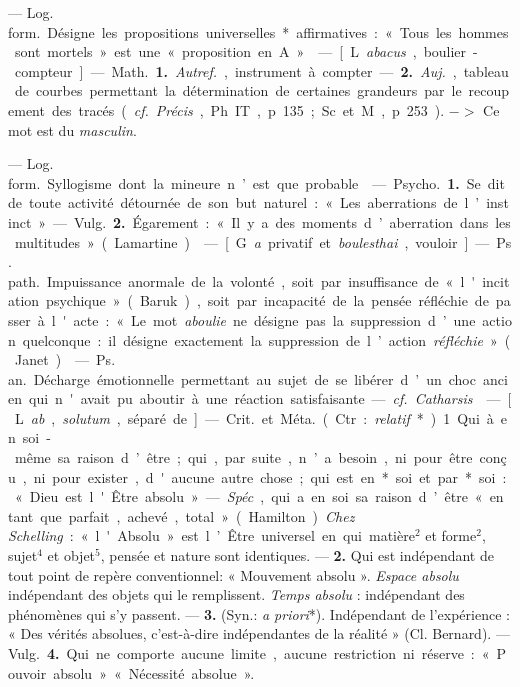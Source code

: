 
	\begin{itemize}[leftmargin=1cm, label=, itemsep=1pt]

 — \si{Log. form.} Désigne les propositions universelles*
affirmatives :
« Tous les hommes sont mortels »
est une « proposition en A ».

 — [L. {\it abacus}, boulier-compteur]
— \si{Math.} {\bf 1.} {\it Autref.}, instrument
à compter. — {\bf 2.} {\it Auj.}, tableau
de courbes permettant la détermination
de certaines grandeurs par
le recoupement des tracés ({\it cf.} {\it Précis},
Ph. IT, p. 135; Sc. et M., p. 253).
$->$ Ce mot est du {\it masculin}.

 — \si{Log. form.} Syllogisme
dont la mineure n’est que probable.

 — \si{Psycho.} {\bf 1.} Se dit de
toute activité détournée de son but
naturel : « Les aberrations de l’instinct ».
— \si{Vulg.} {\bf 2.} Égarement : « Il
y a des moments d’aberration dans
les multitudes » (Lamartine).

 — [G. {\it a}  privatif et {\it boulesthai},
vouloir] — \si{Ps. path.} Impuissance
anormale de la volonté, soit par
insuffisance de « l'incitation psychique »
(Baruk), soit par incapacité
de la pensée réfléchie de passer à
l'acte : « Le mot {\it aboulie} ne désigne
pas la suppression d’une action quelconque :
il désigne exactement la
suppression de l’action {\it réfléchie} »
(Janet).

 — \si{Ps. an.} Décharge émotionnelle
permettant au sujet de se
libérer d’un choc ancien qui n'avait
pu aboutir à une réaction satisfaisante.
— {\it cf.}  {\it Catharsis}.

 — [L. {\it ab}, {\it solutum}, séparé de]
— \si{Crit.} et \si{Méta.} (Ctr. : {\it relatif}*).
1. Qui à en soi-même sa raison
d’être; qui, par suite, n’a besoin, ni
pour être conçu, ni pour exister,
d'aucune autre chose; qui est en*
soi et par* soi : « Dieu est l'Être
absolu ». — {\it Spéc}., qui a en soi sa
raison d’être « en tant que parfait,
achevé, total » (Hamilton). {\it Chez
Schelling} : « l'Absolu » est l’Être
universel en qui matière$^2$ et forme$^2$,
sujet$^4$ et objet$^5$, pensée et nature
sont identiques. — {\bf 2.} Qui est indépendant
de tout point de repère
conventionnel: « Mouvement absolu ».
{\it Espace absolu} indépendant des
objets qui le remplissent. {\it Temps
absolu} : indépendant des phénomènes
qui s’y passent. — {\bf 3.} (Syn.: {\it a priori}*).
Indépendant de l'expérience : « Des
vérités absolues, c’est-à-dire indépendantes
de la réalité » (Cl. Bernard).
— \si{Vulg.} {\bf 4.} Qui ne comporte
aucune limite, aucune restriction
ni réserve : « Pouvoir absolu »
« Nécessité absolue ».


\end{itemize}
